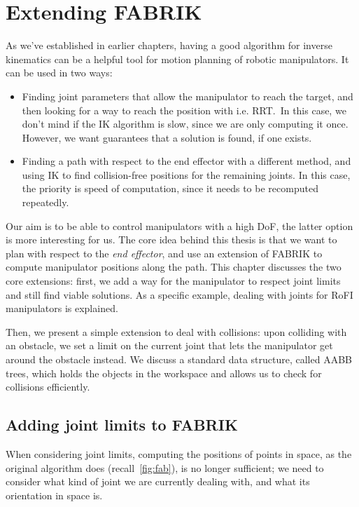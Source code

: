 \chapter{Extending FABRIK}

As we've established in earlier chapters, having a good algorithm for inverse kinematics can be a helpful tool for motion planning of robotic manipulators. It can be used in two ways:

\begin{itemize}
  \item Finding joint parameters that allow the manipulator to reach the target, and then looking for a way to reach the position with i.e. RRT.\ In this case, we don't mind if the IK algorithm is slow, since we are only computing it once. However, we want guarantees that a solution is found, if one exists.
  \item Finding a path with respect to the end effector with a different method, and using IK to find collision-free positions for the remaining joints. In this case, the priority is speed of computation, since it needs to be recomputed repeatedly.
\end{itemize}

Our aim is to be able to control manipulators with a high DoF, the latter option is more interesting for us. The core idea behind this thesis is that we want to plan with respect to the \textit{end effector}, and use an extension of FABRIK to compute manipulator positions along the path. This chapter discusses the two core extensions: first, we add a way for the manipulator to respect joint limits and still find viable solutions. As a specific example, dealing with joints for RoFI manipulators is explained.

Then, we present a simple extension to deal with collisions: upon colliding with an obstacle, we set a limit on the current joint that lets the manipulator get around the obstacle instead. We discuss a standard data structure, called AABB trees, which holds the objects in the workspace and allows us to check for collisions efficiently.

\section{Adding joint limits to FABRIK}

When considering joint limits, computing the positions of points in space, as the original algorithm does (recall~\ref{fig:fab}), is no longer sufficient; we need to consider what kind of joint we are currently dealing with, and what its orientation in space is.

